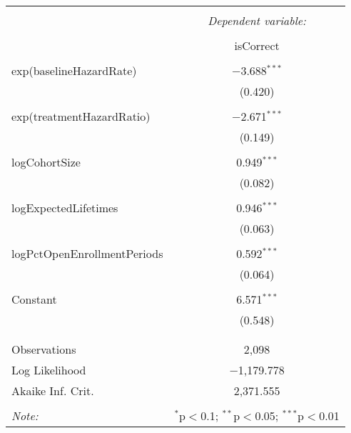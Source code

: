 
\begin{table}[!htbp] \centering 
  \caption{} 
  \label{} 
\begin{tabular}{@{\extracolsep{5pt}}lc} 
\\[-1.8ex]\hline 
\hline \\[-1.8ex] 
 & \multicolumn{1}{c}{\textit{Dependent variable:}} \\ 
\cline{2-2} 
\\[-1.8ex] & isCorrect \\ 
\hline \\[-1.8ex] 
 exp(baselineHazardRate) & $-$3.688$^{***}$ \\ 
  & (0.420) \\ 
  & \\ 
 exp(treatmentHazardRatio) & $-$2.671$^{***}$ \\ 
  & (0.149) \\ 
  & \\ 
 logCohortSize & 0.949$^{***}$ \\ 
  & (0.082) \\ 
  & \\ 
 logExpectedLifetimes & 0.946$^{***}$ \\ 
  & (0.063) \\ 
  & \\ 
 logPctOpenEnrollmentPeriods & 0.592$^{***}$ \\ 
  & (0.064) \\ 
  & \\ 
 Constant & 6.571$^{***}$ \\ 
  & (0.548) \\ 
  & \\ 
\hline \\[-1.8ex] 
Observations & 2,098 \\ 
Log Likelihood & $-$1,179.778 \\ 
Akaike Inf. Crit. & 2,371.555 \\ 
\hline 
\hline \\[-1.8ex] 
\textit{Note:}  & \multicolumn{1}{r}{$^{*}$p$<$0.1; $^{**}$p$<$0.05; $^{***}$p$<$0.01} \\ 
\end{tabular} 
\end{table}  

